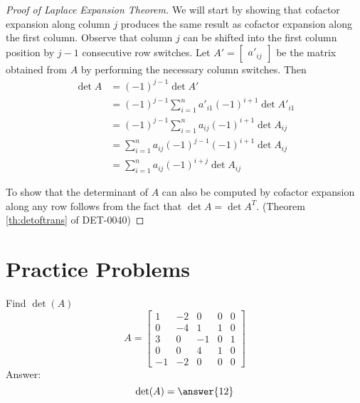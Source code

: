 \documentclass{ximera}
\begin{document}
\begin{proof}[Proof of Laplace Expansion Theorem]
We will start by showing that cofactor expansion along column $j$ produces the same result as cofactor expansion along the first column.  Observe that column $j$ can be shifted into the first column position by $j-1$ consecutive row switches.  Let $A'=\begin{bmatrix}a'_{ij}\end{bmatrix}$ be the matrix obtained from $A$ by performing the necessary column switches.  Then 
\begin{align*}
\det{A}&=(-1)^{j-1}\det{A'}\\
&=(-1)^{j-1}\sum_{i=1}^na'_{i1}(-1)^{i+1}\det{A'_{i1}}\\
&=(-1)^{j-1}\sum_{i=1}^na_{ij}(-1)^{i+1}\det{A_{ij}}\\
&=\sum_{i=1}^na_{ij}(-1)^{j-1}(-1)^{i+1}\det{A_{ij}}\\
&=\sum_{i=1}^na_{ij}(-1)^{i+j}\det{A_{ij}}
\end{align*}

To show that the determinant of $A$ can also be computed by cofactor expansion along any row follows from the fact that $\det{A}=\det{A^T}$. (Theorem \ref{th:detoftrans} of DET-0040)
\end{proof}
\section*{Practice Problems}

\begin{problem}\label{prob:laplace}
Find $\det(A)$
  $$A=\begin{bmatrix}1&-2&0&0&0\\0&-4&1&1&0\\3&0&-1&0&1\\0&0&4&1&0\\-1&-2&0&0&0\end{bmatrix}$$
  Answer:
  $$\det(A)=\answer{12}$$
\end{problem}
\end{document}
